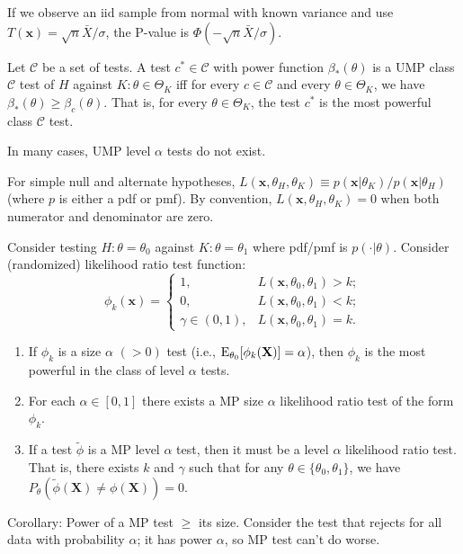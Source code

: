 \documentclass[8pt,letterpaper, landscape]{extarticle} %
\newcommand{\mX}{\ensuremath{\mathbf{X}}}
\newcommand{\mx}{\ensuremath{\mathbf{x}}}
\begin{document}
\begin{multicols}{3}
\begin{description}
If we observe an iid sample from normal with known variance and use $ T(\mx) = \sqrt{n} \bar{X} / \sigma $, the P-value is $ \Phi (- \sqrt{n} \bar{X} / \sigma) $.

 Let $ \mathcal{C} $ be a set of tests. A test $ c^* \in \mathcal{C} $ with power function $ \beta_* (\theta) $ is a UMP class $ \mathcal{C} $ test of $ H $ against $ K \colon \theta \in \Theta_K $ iff for every $ c \in \mathcal{C} $ and every $ \theta \in \Theta_K $, we have $ \beta_* (\theta) \geq \beta_c (\theta) $. That is, for every $ \theta \in \Theta_K $, the test $ c^* $ is the most powerful class $ \mathcal{C} $ test.

In many cases, UMP level $ \alpha $ tests do not exist.

 For simple null and alternate hypotheses, $ L(\mx, \theta_H, \theta_K) \equiv p(\mx | \theta_K) / p(\mx | \theta_H) $ (where $ p $ is either a pdf or pmf). By convention, $ L(\mx, \theta_H, \theta_K) = 0 $ when both numerator and denominator are zero.

 Consider testing $ H \colon \theta = \theta_0 $ against $ K \colon \theta = \theta_1 $ where pdf/pmf is $ p(\cdot | \theta) $. Consider (randomized) likelihood ratio test function:
$$ \phi_k (\mx) = \begin{cases}
1, & L(\mx, \theta_0, \theta_1) > k; \\
0, & L(\mx, \theta_0, \theta_1) < k; \\
\gamma \in (0,1), & L(\mx, \theta_0, \theta_1) = k.
\end{cases} $$
\begin{enumerate}
\item If $ \phi_k $ is a size $ \alpha $ $ (>0) $ test (i.e., $ \E_{\theta_0} [\phi_k (\mX)] = \alpha $), then $ \phi_k $ is the most powerful in the class of level $ \alpha $ tests.
\item For each $ \alpha \in [0,1] $ there exists a MP size $ \alpha $ likelihood ratio test of the form $ \phi_k $.
\item If a test $ \tilde{\phi} $ is a MP level $ \alpha $ test, then it must be a level $ \alpha $ likelihood ratio test. That is, there exists $ k $ and $ \gamma $ such that for any $ \theta \in \{ \theta_0, \theta_1 \} $, we have $ P_\theta (\tilde{\phi}(\mX) \neq \phi(\mX)) = 0 $.
\end{enumerate}
Corollary: Power of a MP test $ \geq $ its size. Consider the test that rejects for all data with probability $ \alpha $; it has power $ \alpha $, so MP test can't do worse.


\end{description}
\end{multicols}
\end{document}
